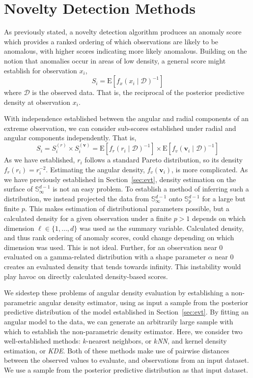 \section{Novelty Detection Methods\label{sec:novelty}}
As previously stated, a novelty detection algorithm produces an anomaly score 
    which provides a ranked ordering of which observations are likely to be 
    anomalous, with higher scores indicating more likely anomalous. Building on 
    the notion that anomalies occur in areas of low density, a general score 
    might establish for observation $x_i$, 
    \[S_i = \text{E}\left[f_{x}(x_i\mid\mathcal{D})^{-1}\right]\]
    where $\mathcal{D}$ is the observed data.  That is, the reciprocal of the 
    posterior predictive density at observation $x_i$.

With independence established between the angular and radial components of an
    extreme observation, we can consider sub-scores established under radial 
    and angular components independently.  That is,
    \[
        S_i = S_i^{(r)}\times S_i^{(\bm{v})} = 
            \text{E}\left[f_r(r_i\mid\mathcal{D})^{-1}\right]\times
            \text{E}\left[f_v(\bm{v}_i\mid\mathcal{D})^{-1}\right]
    \]
    As we have established, $r_i$ follows a standard Pareto distribution, so its
    density $f_r(r_i) = r_i^{-2}$.  Estimating the angular density, 
    $f_v(\bm{v}_i)$, is more complicated.  As we have previously established in
    Section~\ref{sec:evt}, density estimation on the surface of 
    ${\mathbb S}_{\infty}^{d-1}$ is not an easy problem. To establish a method
    of inferring such a distribution, we instead projected the data from 
    $\mathbb{S}_{\infty}^{d-1}$ onto $\mathbb{S}_p^{d-1}$ for a large but finite
    $p$.  This makes estimation of distributional parameters possible, but a
    calculated density for a given observation under a finite $p > 1$ depends on
    which dimension $\ell \in \lbrace 1,\ldots,d\rbrace$ was used as the summary
    variable.  Calculated density, and thus rank ordering of anomaly scores,
    could change depending on which dimension was used.  This is not ideal.
    Further, for an observation near 0 evaluated on a gamma-related distribution 
    with a shape parameter $\alpha$ near 0 creates an evaluated density that 
    tends towards infinity.  This instability would play havoc on directly 
    calculated density-based scores.

We sidestep these problems of angular density evaluation by establishing a 
    non-parametric angular density estimator, using as input a sample from the 
    posterior predictive distribution of the model established in 
    Section~\ref{sec:evt}. By fitting an angular model to the data, we can 
    generate an arbitrarily large sample with which to establish the 
    non-parametric density estimator.  Here, we consider two well-established
    methods: $k$-nearest neighbors, or \emph{$k$NN}, and 
    kernel density estimation, or \emph{KDE}.  Both of these methods make
    use of pairwise distances between the observed values to evaluate, and
    observations from an input dataset.  We use a sample from the posterior
    predictive distribution as that input dataset.  

